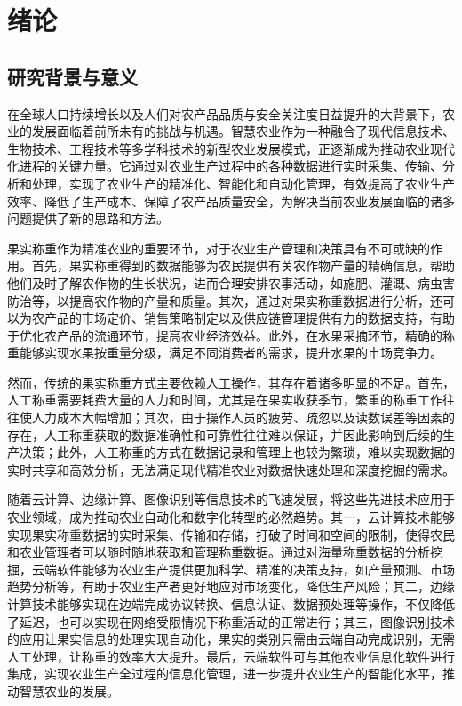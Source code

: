\chapter{绪论}

\section{研究背景与意义}

在全球人口持续增长以及人们对农产品品质与安全关注度日益提升的大背景下，农业的发展面临着前所未有的挑战与机遇。智慧农业作为一种融合了现代信息技术、生物技术、工程技术等多学科技术的新型农业发展模式\cite{赵春江2021智慧农业的发展现状与未来展望}，正逐渐成为推动农业现代化进程的关键力量。它通过对农业生产过程中的各种数据进行实时采集、传输、分析和处理，实现了农业生产的精准化、智能化和自动化管理\cite{李道亮2012物联网与智慧农业}，有效提高了农业生产效率、降低了生产成本、保障了农产品质量安全，为解决当前农业发展面临的诸多问题提供了新的思路和方法。

果实称重作为精准农业的重要环节，对于农业生产管理和决策具有不可或缺的作用\cite{罗锡文2016信息技术提升农业机械化水平}。首先，果实称重得到的数据能够为农民提供有关农作物产量的精确信息，帮助他们及时了解农作物的生长状况\cite{翁杨2019基于深度学习的农业植物表型研究综述}，进而合理安排农事活动，如施肥、灌溉、病虫害防治等，以提高农作物的产量和质量。其次，通过对果实称重数据进行分析，还可以为农产品的市场定价、销售策略制定以及供应链管理提供有力的数据支持，有助于优化农产品的流通环节，提高农业经济效益\cite{Lipcsei2021AnalysisOA}。此外，在水果采摘环节，精确的称重能够实现水果按重量分级，满足不同消费者的需求，提升水果的市场竞争力\cite{Ji2019}。

然而，传统的果实称重方式主要依赖人工操作，其存在着诸多明显的不足。首先，人工称重需要耗费大量的人力和时间，尤其是在果实收获季节，繁重的称重工作往往使人力成本大幅增加\cite{Jiang2012}；其次，由于操作人员的疲劳、疏忽以及读数误差等因素的存在，人工称重获取的数据准确性和可靠性往往难以保证，并因此影响到后续的生产决策\cite{Chen2002}；此外，人工称重的方式在数据记录和管理上也较为繁琐，难以实现数据的实时共享和高效分析，无法满足现代精准农业对数据快速处理和深度挖掘的需求\cite{Widagdo2020RecordingSO}。

随着云计算、边缘计算、图像识别等信息技术的飞速发展，将这些先进技术应用于农业领域，成为推动农业自动化和数字化转型的必然趋势。其一，云计算技术能够实现果实称重数据的实时采集、传输和存储，打破了时间和空间的限制，使得农民和农业管理者可以随时随地获取和管理称重数据\cite{李道亮2012物联网与智慧农业}。通过对海量称重数据的分析挖掘，云端软件能够为农业生产提供更加科学、精准的决策支持，如产量预测、市场趋势分析等，有助于农业生产者更好地应对市场变化，降低生产风险\cite{韩佳伟2022装备与信息协同促进现代智慧农业发展研究}；其二，边缘计算技术能够实现在边端完成协议转换、信息认证、数据预处理等操作，不仅降低了延迟，也可以实现在网络受限情况下称重活动的正常进行\cite{李娜2023基于云边协同计算的粉料仓自称重系统的设计与实现}；其三，图像识别技术的应用让果实信息的处理实现自动化，果实的类别只需由云端自动完成识别，无需人工处理，让称重的效率大大提升\cite{Ni2024}。最后，云端软件可与其他农业信息化软件进行集成\cite{刘洋2013基于物联网与云计算服务的农业温室智能化平台研究与应用术}，实现农业生产全过程的信息化管理，进一步提升农业生产的智能化水平，推动智慧农业的发展。

